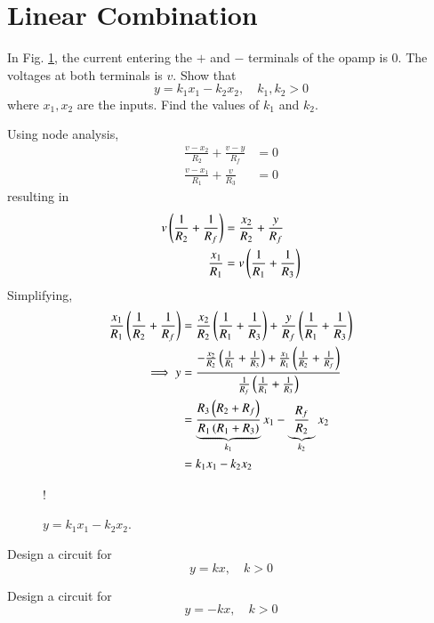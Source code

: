 \documentclass[journal,12pt,twocolumn]{IEEEtran}
\begin{document}
\section{Linear Combination}
\begin{problem}
\label{prob:lincomb_node}
In Fig. \ref{fig:lincomb}, the current entering the $+$ and $-$ terminals of the opamp is 0. The voltages at both terminals is $v$. Show that
\begin{equation}
\label{eq:lincomb_node}
y = k_1x_1 - k_2x_2, \quad k_1, k_2 > 0
\end{equation}
where $x_1,x_2$ are the inputs.  Find the values of $k_1$ and $k_2$.
\end{problem}
%
\solution
Using node analysis,
\begin{align}
\frac{v-x_2}{R_2} + \frac{v-y}{R_f} &= 0
\\
\frac{v-x_1}{R_1} + \frac{v}{R_3} &= 0
\end{align}
resulting in
\begin{align}
v \left(\frac{1}{R_2}+\frac{1}{R_f}\right) &= \frac{x_2}{R_2}+\frac{y}{R_f} 
\\
\frac{x_1}{R_1} &= v\left(\frac{1}{R_1}+\frac{1}{R_3}\right)
\end{align}
Simplifying,
\begin{align}
\frac{x_1}{R_1}\left(\frac{1}{R_2}+\frac{1}{R_f}\right) &= \frac{x_2}{R_2}\left(\frac{1}{R_1}+\frac{1}{R_3}\right) + \frac{y}{R_f} \left(\frac{1}{R_1}+\frac{1}{R_3}\right)
\\
\implies y &= \frac{ -\frac{x_2}{R_2}\left(\frac{1}{R_1}+\frac{1}{R_3}\right) +\frac{x_1}{R_1}\left(\frac{1}{R_2}+\frac{1}{R_f}\right) }{\frac{1}{R_f}\left(\frac{1}{R_1}+\frac{1}{R_3}\right)}
\\
&=  \underbrace{\frac{R_3\left({R_2}+{R_f}\right)}{R_1\left({R_1}+{R_3}\right)}}_{k_1}x_1-\underbrace{\frac{R_f}{R_2}}_{k_2}x_2
\\
&= k_1 x_1 - k_2 x_2
\end{align}

\begin{figure}[!h]
\centering
\resizebox {\columnwidth} {!} {

}
\caption{$y = k_1x_1 - k_2x_2$.}
\label{fig:lincomb}
\end{figure}
\begin{problem}
Design a circuit for 
\begin{equation}
\label{eq:lin_pos}
y = kx, \quad k > 0
\end{equation}
\end{problem}
\begin{problem}
Design a circuit for 
\begin{equation}
\label{eq:lin_neg}
y = -kx, \quad k > 0
\end{equation}
\end{problem}
\end{document}
